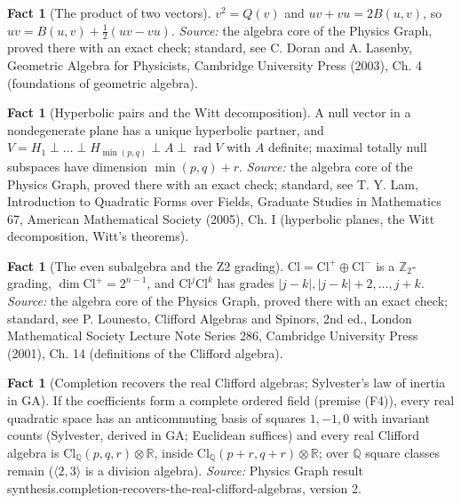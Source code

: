 \documentclass[11pt]{article}
\theoremstyle{definition}
\newtheorem{fact}[theorem]{Fact}
\theoremstyle{plain}
\providecommand{\Cl}{}\renewcommand{\Cl}{\mathrm{Cl}}
\providecommand{\Q}{}\renewcommand{\Q}{\mathbb{Q}}
\providecommand{\R}{}\renewcommand{\R}{\mathbb{R}}
\begin{document}
\begin{fact}[The product of two vectors]\label{c:std-algebra.vector-squares}
$v^{2} = Q(v)$ and $uv + vu = 2B(u, v)$, so $uv = B(u, v) + \tfrac12(uv - vu)$.
\emph{Source:} the algebra core of the Physics Graph, proved there with an exact check; standard, see C. Doran and A. Lasenby, Geometric Algebra for Physicists, Cambridge University Press (2003), Ch. 4 (foundations of geometric algebra).
\end{fact}

\begin{fact}[Hyperbolic pairs and the Witt decomposition]\label{c:std-algebra.witt-decomposition}
A null vector in a nondegenerate plane has a unique hyperbolic partner, and $V = H_1 \perp \dots \perp H_{\min(p,q)} \perp A \perp \operatorname{rad} V$ with $A$ definite; maximal totally null subspaces have dimension $\min(p,q) + r$.
\emph{Source:} the algebra core of the Physics Graph, proved there with an exact check; standard, see T. Y. Lam, Introduction to Quadratic Forms over Fields, Graduate Studies in Mathematics 67, American Mathematical Society (2005), Ch. I (hyperbolic planes, the Witt decomposition, Witt's theorems).
\end{fact}

\begin{fact}[The even subalgebra and the Z2 grading]\label{c:std-algebra.z2-grading}
$\Cl = \Cl^{+} \oplus \Cl^{-}$ is a $\mathbb{Z}_2$-grading, $\dim \Cl^{+} = 2^{n-1}$, and $\Cl^{j}\Cl^{k}$ has grades $|j-k|, |j-k|+2, \dots, j+k$.
\emph{Source:} the algebra core of the Physics Graph, proved there with an exact check; standard, see P. Lounesto, Clifford Algebras and Spinors, 2nd ed., London Mathematical Society Lecture Note Series 286, Cambridge University Press (2001), Ch. 14 (definitions of the Clifford algebra).
\end{fact}

\begin{fact}[Completion recovers the real Clifford algebras; Sylvester's law of inertia in GA]\label{c:synthesis.completion-recovers-the-real-clifford-algebras}
If the coefficients form a complete ordered field (premise (F4)), every real quadratic space has an anticommuting basis of squares $1, -1, 0$ with invariant counts (Sylvester, derived in GA; Euclidean suffices) and every real Clifford algebra is $\Cl_{\Q}(p,q,r) \otimes \R$, inside $\Cl_{\Q}(p{+}r,q{+}r) \otimes \R$; over $\Q$ square classes remain ($\langle 2, 3\rangle$ is a division algebra).
\emph{Source:} Physics Graph result synthesis.completion-recovers-the-real-clifford-algebras, version 2.
\end{fact}
\end{document}
